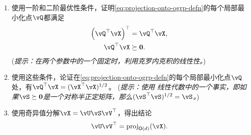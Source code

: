 \documentclass[../../book-main_zh.tex]{subfiles}
\begin{document}
\begin{exercise}
\begin{enumerate}
        \begin{enumerate}
            \item 使用一阶和二阶最优性条件，证明\eqref{eq:projection-onto-ogrp-defn}的每个局部最小化点$\vQ$都满足
            \begin{align*}
                \left( \vQ^\top \vX \right)^\top &= \vQ^\top \vX, \\
                \vQ^\top \vX &\succeq \mathbf{0}.
            \end{align*}
            (\textit{提示：在两个参数中的一个固定时，利用克罗内克积的线性性。})
            \item 使用这些条件，论证在\eqref{eq:projection-onto-ogrp-defn}的每个局部最小化点$\vQ$处，有$\vQ^\top \vX = (\vX^\top \vX)^{1/2}$。
            (\textit{提示：使用%
            线性代数中的一个事实，即如果$\vS \succeq \mathbf{0}$是一个对称半正定矩阵，那么$(\vS^\top\vS)^{1/2} = \vS$。})
            \item 使用奇异值分解$\vX = \vU \vS \vV^\top$，得出结论
            \begin{equation*}
                \vU \vV^\top
                =
                \mathrm{proj}_{\O(d)}(\vX).
            \end{equation*}
        \end{enumerate}
    \end{enumerate}
\end{exercise}

\end{document}
